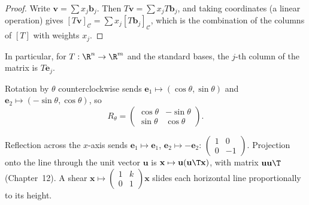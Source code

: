 \begin{proof}
Write $\mathbf{v}=\sum x_j\mathbf{b}_j$. Then $T\mathbf{v}=\sum x_jT\mathbf{b}_j$, and taking coordinates (a linear operation) gives $[T\mathbf{v}]_{\mathcal{C}}=\sum x_j[T\mathbf{b}_j]_{\mathcal{C}}$, which is the combination of the columns of $[T]$ with weights $x_j$.
\end{proof}

In particular, for $T:\R^n\to\R^m$ and the standard bases, the $j$-th column of the matrix is $T\mathbf{e}_j$.

\begin{example}[Rotation]\label{ex:rotation}
Rotation by $\theta$ counterclockwise sends $\mathbf{e}_1\mapsto(\cos\theta,\sin\theta)$ and $\mathbf{e}_2\mapsto(-\sin\theta,\cos\theta)$, so
\[ R_\theta=\begin{pmatrix}\cos\theta&-\sin\theta\\\sin\theta&\cos\theta\end{pmatrix}. \]
\end{example}

\begin{example}
Reflection across the $x$-axis sends $\mathbf{e}_1\mapsto\mathbf{e}_1$, $\mathbf{e}_2\mapsto-\mathbf{e}_2$: $\begin{pmatrix}1&0\\0&-1\end{pmatrix}$. Projection onto the line through the unit vector $\mathbf{u}$ is $\mathbf{x}\mapsto\mathbf{u}(\mathbf{u}\T\mathbf{x})$, with matrix $\mathbf{u}\mathbf{u}\T$ (Chapter~12). A shear $\mathbf{x}\mapsto\begin{pmatrix}1&k\\0&1\end{pmatrix}\mathbf{x}$ slides each horizontal line proportionally to its height.
\end{example}

